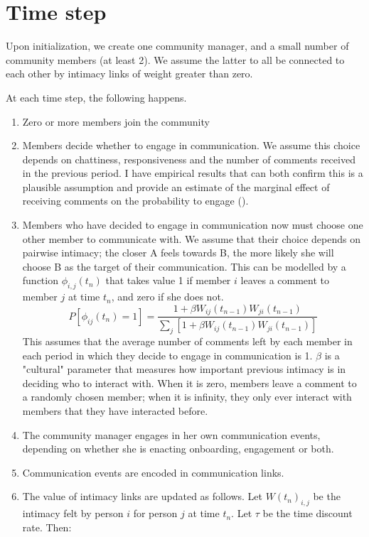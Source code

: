\documentclass{article}
\begin{document}
\section{Time step}

Upon initialization, we create one community manager, and a small number of community members (at least 2). We assume the latter to all be connected to each other by intimacy links of weight greater than zero. 

At each time step, the following happens.

\begin{enumerate}
\item Zero or more members join the community
\item Members decide whether to engage in communication. We assume this choice depends on chattiness, responsiveness and the number of comments received in the previous period. I have empirical results that can both confirm this is a plausible assumption and provide an estimate of the marginal effect of receiving comments on the probability to engage (\cite{cottica2016microfoundations}).
\item Members who have decided to engage in communication now must choose one other member to communicate with. We assume that their choice depends on pairwise intimacy; the closer A feels towards B, the more likely she will choose B as the target of their communication. This can be modelled by a function $\phi_{i,j} (t_n)$ that takes value 1 if member $i$ leaves a comment to member $j$ at time $t_n$, and zero if she does not. 
\begin{equation}
	P [\phi_{ij}(t_n) = 1] = \frac{1 + \beta W_{ij}(t_{n-1}) W_{ji}(t_{n-1})}{\sum_j [1 + \beta W_{ij}(t_{n-1}) W_{ji}(t_{n-1})]}
	\label{eq:mainEngine}
 \end {equation}
 This assumes that the average number of comments left by each member in each period in which they decide to engage in communication is 1. $\beta$ is a "cultural" parameter that measures how important previous intimacy is in deciding who to interact with. When it is zero, members leave a comment to a randomly chosen member; when it is infinity, they only ever interact with members that they have interacted before. 
\item The community manager engages in her own communication events, depending on whether she is enacting onboarding, engagement or both.
\item Communication events are encoded in communication links.
\item The value of intimacy links are updated as follows. Let $W(t_n)_{i,j}$ be the intimacy felt by person $i$ for person $j$ at time $t_n$. Let $\tau$ be the time discount rate. Then: 

\end{enumerate}
\end{document}
